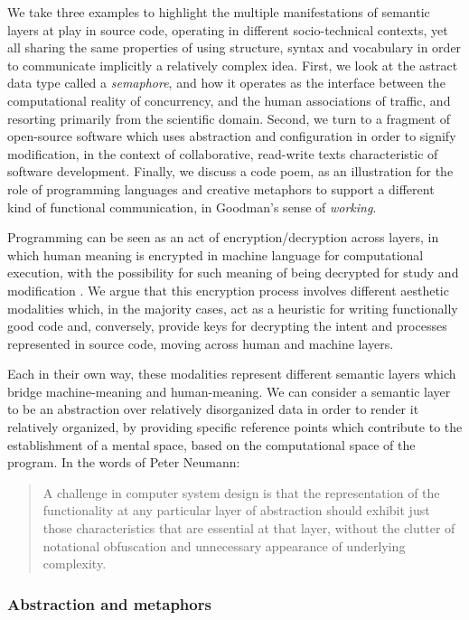 We take three examples to highlight the multiple manifestations of semantic layers at play in source code, operating in different socio-technical contexts, yet all sharing the same properties of using structure, syntax and vocabulary in order to communicate implicitly a relatively complex idea. First, we look at the astract data type called a \emph{semaphore}, and how it operates as the interface between the computational reality of concurrency, and the human associations of traffic, and resorting primarily from the scientific domain. Second, we turn to a fragment of open-source software which uses abstraction and configuration in order to signify modification, in the context of collaborative, read-write texts characteristic of software development. Finally, we discuss a code poem, as an illustration for the role of programming languages and creative metaphors to support a different kind of functional communication, in Goodman's sense of \emph{working}.

Programming can be seen as an act of encryption/decryption across layers, in which human meaning is encrypted in machine language for computational execution, with the possibility for such meaning of being decrypted for study and modification \citep{ledgard_coding_2011}. We argue that this encryption process involves different aesthetic modalities which, in the majority cases, act as a heuristic for writing functionally good code and, conversely, provide keys for decrypting the intent and processes represented in source code, moving across human and machine layers.

Each in their own way, these modalities represent different semantic layers which bridge machine-meaning and human-meaning. We can consider a semantic layer to be an abstraction over relatively disorganized data in order to render it relatively organized, by providing specific reference points which contribute to the establishment of a mental space, based on the computational space of the program. In the words of Peter Neumann:

\begin{quote}
  A challenge in computer system design is that the representation of the functionality at any particular layer of abstraction should exhibit just those characteristics that are essential at that layer, without the clutter of notational obfuscation and unnecessary appearance of underlying complexity. \citep{neumann_beauty_1990}
\end{quote}

\subsubsection{Abstraction and metaphors}
\label{subsubsec:abstraction-metaphors}

